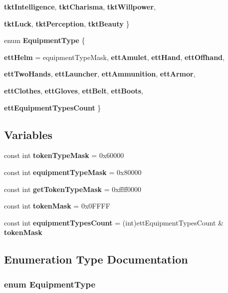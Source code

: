 \begin{CompactItemize}
{\bf tkt\-Intelligence}, 
{\bf tkt\-Charisma}, 
{\bf tkt\-Willpower}, 
\par
{\bf tkt\-Luck}, 
{\bf tkt\-Perception}, 
{\bf tkt\-Beauty}
 \}
\item 
enum {\bf Equipment\-Type} \{ \par
{\bf ett\-Helm} =  equipment\-Type\-Mask, 
{\bf ett\-Amulet}, 
{\bf ett\-Hand}, 
{\bf ett\-Offhand}, 
\par
{\bf ett\-Two\-Hands}, 
{\bf ett\-Launcher}, 
{\bf ett\-Ammunition}, 
{\bf ett\-Armor}, 
\par
{\bf ett\-Clothes}, 
{\bf ett\-Gloves}, 
{\bf ett\-Belt}, 
{\bf ett\-Boots}, 
\par
{\bf ett\-Equipment\-Types\-Count}
 \}
\end{CompactItemize}
\subsection*{Variables}
\begin{CompactItemize}
\item 
const int {\bf token\-Type\-Mask} = 0x60000
\item 
const int {\bf equipment\-Type\-Mask} = 0x80000
\item 
const int {\bf get\-Token\-Type\-Mask} = 0xffff0000
\item 
const int {\bf token\-Mask} = 0x0FFFF
\item 
const int {\bf equipment\-Types\-Count} = (int)ett\-Equipment\-Types\-Count \& {\bf token\-Mask}
\end{CompactItemize}


\subsection{Enumeration Type Documentation}
\subsubsection{\setlength{\rightskip}{0pt plus 5cm}enum {\bf Equipment\-Type}}\label{masks_8hpp_a86}


